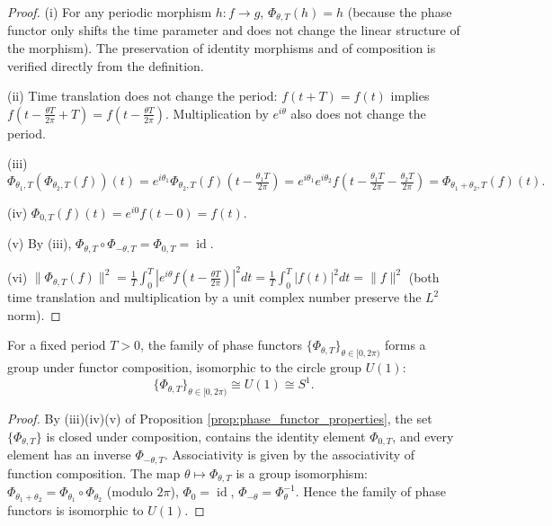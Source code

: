 \begin{proof}
(i) For any periodic morphism $h: f \to g$, $\Phi_{\theta, T}(h) = h$ (because the phase functor only shifts the time parameter and does not change the linear structure of the morphism). The preservation of identity morphisms and of composition is verified directly from the definition.

(ii) Time translation does not change the period: $f(t + T) = f(t)$ implies $f(t - \frac{\theta T}{2\pi} + T) = f(t - \frac{\theta T}{2\pi})$. Multiplication by $e^{i\theta}$ also does not change the period.

(iii)
\[
\Phi_{\theta_1, T}(\Phi_{\theta_2, T}(f))(t) = e^{i\theta_1} \Phi_{\theta_2, T}(f)\!\left( t - \tfrac{\theta_1 T}{2\pi} \right) = e^{i\theta_1} e^{i\theta_2} f\!\left( t - \tfrac{\theta_1 T}{2\pi} - \tfrac{\theta_2 T}{2\pi} \right) = \Phi_{\theta_1 + \theta_2, T}(f)(t).
\]

(iv) $\Phi_{0, T}(f)(t) = e^{i0} f(t - 0) = f(t)$.

(v) By (iii), $\Phi_{\theta, T} \circ \Phi_{-\theta, T} = \Phi_{0, T} = \operatorname{id}$.

(vi) $\|\Phi_{\theta, T}(f)\|^2 = \frac{1}{T}\int_0^T |e^{i\theta} f(t - \frac{\theta T}{2\pi})|^2 dt = \frac{1}{T}\int_0^T |f(t)|^2 dt = \|f\|^2$ (both time translation and multiplication by a unit complex number preserve the $L^2$ norm).
\end{proof}

\begin{theorem}\label{thm:phase_functor_group}
For a fixed period $T > 0$, the family of phase functors $\{\Phi_{\theta, T}\}_{\theta \in [0, 2\pi)}$ forms a group under functor composition, isomorphic to the circle group $U(1)$:
\[
\{\Phi_{\theta, T}\}_{\theta \in [0, 2\pi)} \cong U(1) \cong S^1.
\]
\end{theorem}

\begin{proof}
By (iii)(iv)(v) of Proposition \ref{prop:phase_functor_properties}, the set $\{\Phi_{\theta, T}\}$ is closed under composition, contains the identity element $\Phi_{0, T}$, and every element has an inverse $\Phi_{-\theta, T}$. Associativity is given by the associativity of function composition. The map $\theta \mapsto \Phi_{\theta, T}$ is a group isomorphism: $\Phi_{\theta_1 + \theta_2} = \Phi_{\theta_1} \circ \Phi_{\theta_2}$ (modulo $2\pi$), $\Phi_0 = \operatorname{id}$, $\Phi_{-\theta} = \Phi_\theta^{-1}$. Hence the family of phase functors is isomorphic to $U(1)$.
\end{proof}

